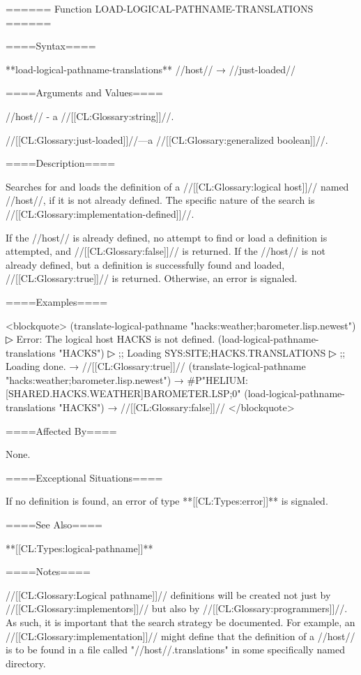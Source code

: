 ====== Function LOAD-LOGICAL-PATHNAME-TRANSLATIONS ======

====Syntax====

**load-logical-pathname-translations** //host// → //just-loaded//

====Arguments and Values====

//host// - a //[[CL:Glossary:string]]//.

//[[CL:Glossary:just-loaded]]//---a //[[CL:Glossary:generalized boolean]]//.

====Description====

Searches for and loads the definition of a //[[CL:Glossary:logical host]]// named //host//, if it is not already defined. The specific nature of the search is //[[CL:Glossary:implementation-defined]]//.

If the //host// is already defined, no attempt to find or load a definition is attempted, and //[[CL:Glossary:false]]// is returned. If the //host// is not already defined, but a definition is successfully found and loaded, //[[CL:Glossary:true]]// is returned. Otherwise, an error is signaled.

====Examples====

<blockquote> (translate-logical-pathname "hacks:weather;barometer.lisp.newest")
▷ Error: The logical host HACKS is not defined. (load-logical-pathname-translations "HACKS")
▷ ;; Loading SYS:SITE;HACKS.TRANSLATIONS
▷ ;; Loading done. → //[[CL:Glossary:true]]// (translate-logical-pathname "hacks:weather;barometer.lisp.newest") → #P"HELIUM:[SHARED.HACKS.WEATHER]BAROMETER.LSP;0" (load-logical-pathname-translations "HACKS") → //[[CL:Glossary:false]]// </blockquote>

====Affected By====

None.

====Exceptional Situations====

If no definition is found, an error of type **[[CL:Types:error]]** is signaled.

====See Also====

**[[CL:Types:logical-pathname]]**

====Notes====

//[[CL:Glossary:Logical pathname]]// definitions will be created not just by //[[CL:Glossary:implementors]]// but also by //[[CL:Glossary:programmers]]//. As such, it is important that the search strategy be documented. For example, an //[[CL:Glossary:implementation]]// might define that the definition of a //host// is to be found in a file called "//host//.translations" in some specifically named directory.


